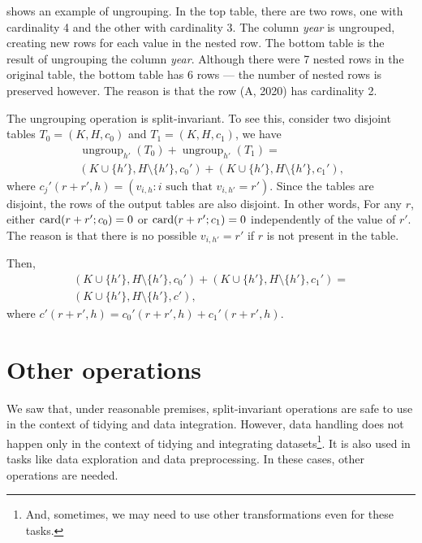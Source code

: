  shows an example of ungrouping.  In the top table, there are two rows,
one with cardinality 4 and the other with cardinality 3.  The column \emph{year} is
ungrouped, creating new rows for each value in the nested row.  The bottom table is the
result of ungrouping the column \emph{year}.  Although there were 7 nested rows in the
original table, the bottom table has 6 rows --- the number of nested rows is preserved
however.  The reason is that the row (A, 2020) has cardinality 2.

The ungrouping operation is split-invariant.  To see this, consider two disjoint tables
$T_0 = (K, H, c_0)$ and $T_1 = (K, H, c_1)$, we have
\begin{multline*}
  \operatorname{ungroup}_{h'}(T_0) + \operatorname{ungroup}_{h'}(T_1) = \\
    \left(K \cup \{h'\}, H \setminus \{h'\}, c_0'\right) +
    \left(K \cup \{h'\}, H \setminus \{h'\}, c_1'\right)\text{,}
\end{multline*}
where $c_j'(r + r', h) = (v_{i,h} : i \text{ such that } v_{i, h'} = r')$. Since the
tables are disjoint, the rows of the output tables are also disjoint.  In other words,
For any $r$, either $\rowcard[{r + r'; c_0}] = 0$ or $\rowcard[{r + r'; c_1}] = 0$
independently of the value of $r'$.  The reason is that there is no possible $v_{i,h'} =
r'$ if $r$ is not present in the table.

Then,
\begin{multline*}
  \left(K \cup \{h'\}, H \setminus \{h'\}, c_0'\right) +
  \left(K \cup \{h'\}, H \setminus \{h'\}, c_1'\right) = \\
    \left(K \cup \{h'\}, H \setminus \{h'\}, c'\right)\text{,}
\end{multline*}
where $c'(r + r', h) = c_0'(r + r', h) + c_1'(r + r', h)$.

\section{Other operations}

We saw that, under reasonable premises, split-invariant operations are safe to use in the
context of tidying and data integration.  However, data handling does not happen only in
the context of tidying and integrating datasets\footnote{And, sometimes, we may need to
use other transformations even for these tasks.}.  It is also used in tasks like data
exploration and data preprocessing.  In these cases, other operations are needed.

